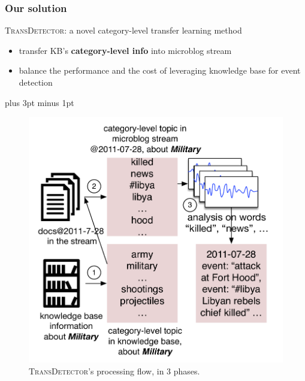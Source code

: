 \documentclass{beamer}
\begin{document}
\begin{frame}
\frametitle{Our solution}	
\textsc{TransDetector}: a novel category-level transfer learning method
\begin{itemize}
	\item transfer KB's \textbf{category-level info} into microblog stream
	\item balance the performance and the cost of leveraging knowledge base for event detection
\end{itemize}

\intextsep=5pt plus 3pt minus 1pt %
\begin{figure}[h]
		\setlength{\abovecaptionskip}{0.cm}
        \setlength{\belowcaptionskip}{0.cm}
        \centering
        \includegraphics[width=0.43\columnwidth]{../img/NSDetectorExample.pdf}
        \caption{\textsc{TransDetector}'s processing flow, in 3 phases.}
        \label{fig:hood}
\end{figure}


\end{frame}
\end{document}
